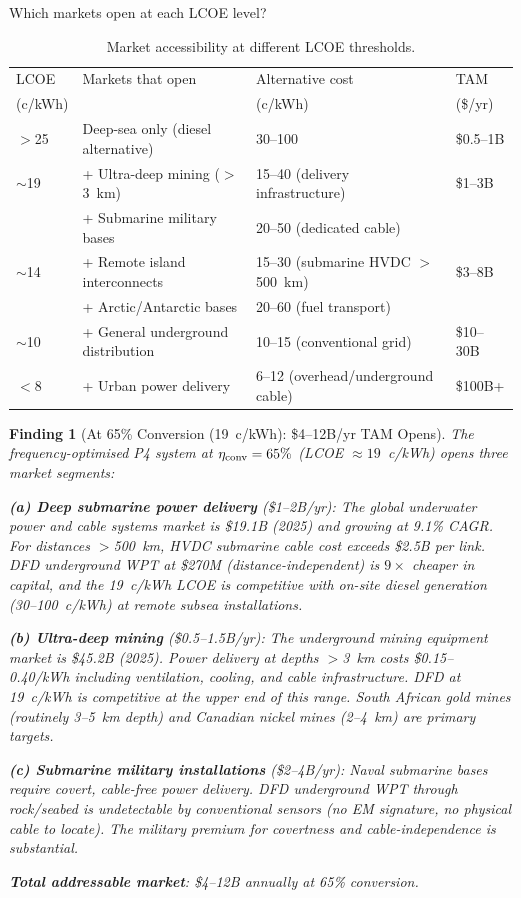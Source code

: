 \documentclass[11pt]{article}
\newtheorem{finding}{Finding}
\begin{document}
Which markets open at each LCOE level?

\begin{table}[H]
\centering
\caption{Market accessibility at different LCOE thresholds.}
\label{tab:market-thresholds}
\begin{tabular}{@{}p{2cm}p{4cm}p{5cm}p{2cm}@{}}
\toprule
LCOE & Markets that open & Alternative cost & TAM \\
(c/kWh) & & (c/kWh) & (\$/yr) \\
\midrule
$>$25 & Deep-sea only (diesel alternative) & 30--100 & \$0.5--1B \\
$\sim$19 & + Ultra-deep mining ($>$3~km) & 15--40 (delivery infrastructure) & \$1--3B \\
 & + Submarine military bases & 20--50 (dedicated cable) & \\
$\sim$14 & + Remote island interconnects & 15--30 (submarine HVDC $>$500~km) & \$3--8B \\
 & + Arctic/Antarctic bases & 20--60 (fuel transport) & \\
$\sim$10 & + General underground distribution & 10--15 (conventional grid) & \$10--30B \\
$<$8 & + Urban power delivery & 6--12 (overhead/underground cable) & \$100B+ \\
\bottomrule
\end{tabular}
\end{table}

\begin{finding}[At 65\% Conversion (19~c/kWh): \$4--12B/yr TAM Opens]
\label{find:market-threshold}
The frequency-optimised P4 system at $\eta_{\rm conv} = 65\%$ (LCOE
$\approx 19$~c/kWh) opens three market segments:

\textbf{(a) Deep submarine power delivery} (\$1--2B/yr):
The global underwater power and cable systems market is \$19.1B (2025) and
growing at 9.1\% CAGR. For distances $>$500~km, HVDC submarine cable cost
exceeds \$2.5B per link. DFD underground WPT at \$270M (distance-independent)
is $9\times$ cheaper in capital, and the 19~c/kWh LCOE is competitive with
on-site diesel generation (30--100~c/kWh) at remote subsea installations.

\textbf{(b) Ultra-deep mining} (\$0.5--1.5B/yr):
The underground mining equipment market is \$45.2B (2025). Power delivery at
depths $>$3~km costs \$0.15--0.40/kWh including ventilation, cooling, and
cable infrastructure. DFD at 19~c/kWh is competitive at the upper end of
this range. South African gold mines (routinely 3--5~km depth) and Canadian
nickel mines (2--4~km) are primary targets.

\textbf{(c) Submarine military installations} (\$2--4B/yr):
Naval submarine bases require covert, cable-free power delivery. DFD
underground WPT through rock/seabed is undetectable by conventional sensors
(no EM signature, no physical cable to locate). The military premium
for covertness and cable-independence is substantial.

\textbf{Total addressable market}: \$4--12B annually at 65\% conversion.
\end{finding}
\end{document}
